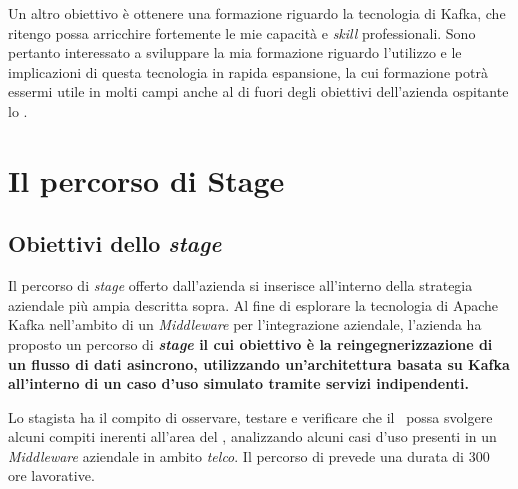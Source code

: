 Un altro obiettivo è ottenere una formazione riguardo la tecnologia di Kafka, che ritengo possa arricchire fortemente le mie capacità e \textit{skill} professionali.
Sono pertanto interessato a sviluppare la mia formazione riguardo l'utilizzo e le implicazioni di questa tecnologia in rapida espansione, la cui formazione potrà essermi utile in molti campi anche al di fuori degli obiettivi dell'azienda ospitante lo \stage.


\section{Il percorso di Stage}


%
%

\subsection{Obiettivi dello \textit{stage}}

Il percorso di \textit{stage} offerto dall'azienda si inserisce all'interno della strategia aziendale più ampia descritta sopra.
Al fine di esplorare la tecnologia di Apache Kafka nell'ambito di un \textit{Middleware} per l'integrazione aziendale, l'azienda ha proposto un percorso di \textbf{\textit{stage} il cui obiettivo è la reingegnerizzazione di un flusso di dati asincrono, utilizzando un'architettura basata su Kafka all'interno di un caso d'uso simulato tramite servizi indipendenti.}

Lo stagista ha il compito di osservare, testare e verificare che il \software\ possa svolgere alcuni compiti inerenti all'area del , analizzando alcuni casi d'uso presenti in un \textit{Middleware} aziendale in ambito \textit{telco}.
Il percorso di prevede una durata di 300 ore lavorative.

